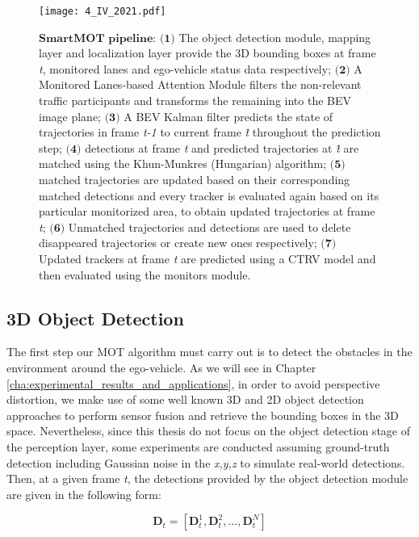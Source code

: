 \begin{figure*}[thpb]
	\centering
	\texttt{[image: 4\_IV\_2021.pdf]}
	\caption[SmartMOT pipeline]{$\textbf{SmartMOT pipeline}$: $\textbf{(1)}$ The object detection module, mapping layer and localization layer provide the 3D bounding boxes at frame \textit{t}, monitored lanes and ego-vehicle status data respectively; $\textbf{(2)}$ A Monitored Lanes-based Attention Module filters the non-relevant traffic participants and transforms the remaining into the \ac{BEV} image plane; $\textbf{(3)}$ A \ac{BEV} Kalman filter predicts the state of trajectories in frame \textit{t-1} to current frame \textit{\^{t}} throughout the prediction step; $\textbf{(4)}$ detections at frame \textit{t} and predicted trajectories at \textit{\^{t}} are matched using the Khun-Munkres (\aka Hungarian) algorithm; $\textbf{(5)}$ matched trajectories are updated based on their corresponding matched detections and every tracker is evaluated again based on its particular monitorized area, to obtain updated trajectories at frame \textit{{t}}; $\textbf{(6)}$ Unmatched trajectories and detections are used to delete disappeared trajectories or create new ones respectively; $\textbf{(7)}$ Updated trackers at frame \textit{{t}} are predicted using a CTRV model and then evaluated using the monitors module.}
	\label{fig:4_IV_2021}
\end{figure*}

\subsection{3D Object Detection}

The first step our \ac{MOT} algorithm must carry out is to detect the obstacles in the environment around the ego-vehicle. As we will see in Chapter \ref{cha:experimental_results_and_applications}, in order to avoid perspective distortion, we make use of some well known 3D and 2D object detection approaches \cite{lang2019pointpillars, redmon2016you} to perform sensor fusion and retrieve the bounding boxes in the 3D space. Nevertheless, since this thesis do not focus on the object detection stage of the perception layer, some experiments are conducted assuming ground-truth detection including Gaussian noise in the \textit{x,y,z} to simulate real-world detections. Then, at a given frame \textit{t}, the detections provided by the object detection module are given in the following form:

\begin{equation}
	\label{eq:5_smartmot_detection}
	\textbf{D}_{t} =[\textbf{D}_{t}^{1},\textbf{D}_{t}^{2}, ...,\textbf{D}_{t}^{N}]
\end{equation}

